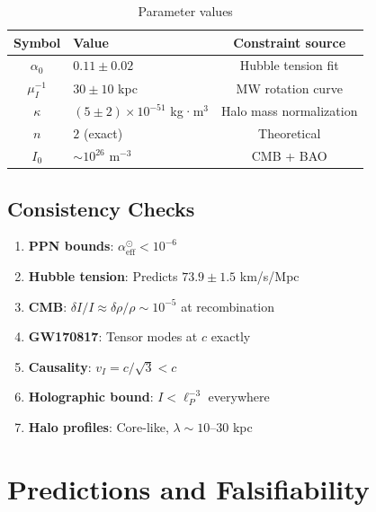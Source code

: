 \documentclass[12pt, a4paper]{article}
\begin{document}
\begin{table}[H]
\centering
\caption{Parameter values}
\begin{tabular}{clc}
\toprule
\textbf{Symbol} & \textbf{Value} & \textbf{Constraint source} \\
\midrule
$\alpha_0$ & $0.11 \pm 0.02$ & Hubble tension fit \\
$\mu_I^{-1}$ & $30 \pm 10$ kpc & MW rotation curve \\
$\kappa$ & $(5 \pm 2) \times 10^{-51}$ kg·m$^3$ & Halo mass normalization \\
$n$ & $2$ (exact) & Theoretical \\
$I_0$ & $\sim 10^{26}$ m$^{-3}$ & CMB + BAO \\
\bottomrule
\end{tabular}
\end{table}

\subsection{Consistency Checks}

\begin{enumerate}
    \item \textbf{PPN bounds}: $\alpha_{\text{eff}}^{\odot} < 10^{-6}$ \checkmark
    \item \textbf{Hubble tension}: Predicts $73.9 \pm 1.5$ km/s/Mpc \checkmark
    \item \textbf{CMB}: $\delta I/I \approx \delta\rho/\rho \sim 10^{-5}$ at recombination \checkmark
    \item \textbf{GW170817}: Tensor modes at $c$ exactly \checkmark
    \item \textbf{Causality}: $v_I = c/\sqrt{3} < c$ \checkmark
    \item \textbf{Holographic bound}: $I < \ell_P^{-3}$ everywhere \checkmark
    \item \textbf{Halo profiles}: Core-like, $\lambda \sim 10$--$30$ kpc \checkmark
\end{enumerate}


\section{Predictions and Falsifiability}
\end{document}
